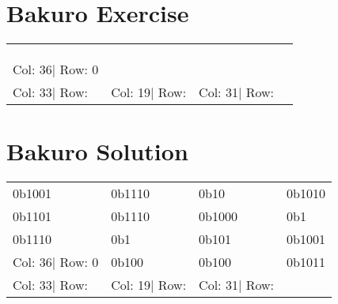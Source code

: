 \documentclass[]{article}
\begin{document}
			\section{Bakuro Exercise}\begin{tabular}{llll}
\hline
                 &               &               &  \\
                 &               &               &  \\
                 &               &               &  \\
 Col: 36| Row: 0 &               &               &  \\
 Col: 33| Row:   & Col: 19| Row: & Col: 31| Row: &  \\
\hline
\end{tabular}\newpage 
 \section{Bakuro Solution} 
\begin{tabular}{llll}
\hline
 0b1001          & 0b1110        & 0b10          & 0b1010 \\
 0b1101          & 0b1110        & 0b1000        & 0b1    \\
 0b1110          & 0b1           & 0b101         & 0b1001 \\
 Col: 36| Row: 0 & 0b100         & 0b100         & 0b1011 \\
 Col: 33| Row:   & Col: 19| Row: & Col: 31| Row: &        \\
\hline
\end{tabular}
 
\end{document}
